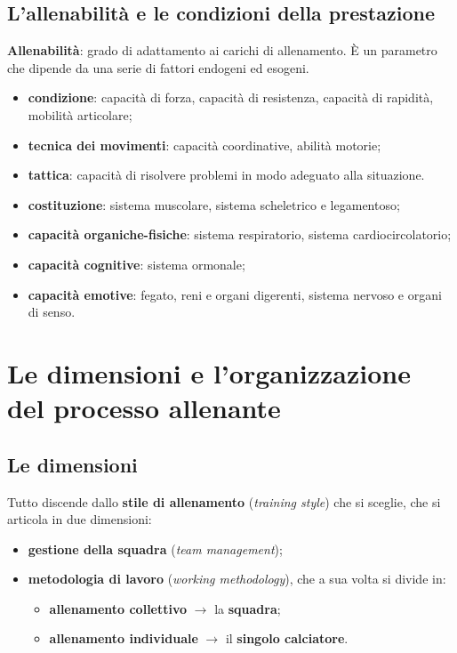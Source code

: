 \subsection{L'allenabilità e le condizioni della prestazione}

\textbf{Allenabilità}: grado di adattamento ai carichi di allenamento. È un parametro che dipende da
una serie di fattori endogeni ed esogeni.

\begin{itemize}
  \item \textbf{condizione}: capacità di forza, capacità di resistenza, capacità di rapidità,
    mobilità articolare;
  \item \textbf{tecnica dei movimenti}: capacità coordinative, abilità motorie;
  \item \textbf{tattica}: capacità di risolvere problemi in modo adeguato alla situazione.
\end{itemize}

\begin{itemize}
  \item \textbf{costituzione}: sistema muscolare, sistema scheletrico e legamentoso;
  \item \textbf{capacità organiche-fisiche}: sistema respiratorio, sistema cardiocircolatorio;
  \item \textbf{capacità cognitive}: sistema ormonale;
  \item \textbf{capacità emotive}: fegato, reni e organi digerenti, sistema nervoso e organi di
    senso.
\end{itemize}

\section{Le dimensioni e l'organizzazione del processo allenante}

\subsection{Le dimensioni}

Tutto discende dallo \textbf{stile di allenamento} (\textit{training style}) che si sceglie, che si
articola in due dimensioni:

\begin{itemize}
  \item \textbf{gestione della squadra} (\textit{team management});
  \item \textbf{metodologia di lavoro} (\textit{working methodology}), che a sua volta si divide in:
    \begin{itemize}
      \item \textbf{allenamento collettivo} $\rightarrow$ la \textbf{squadra};
      \item \textbf{allenamento individuale} $\rightarrow$ il \textbf{singolo calciatore}.
    \end{itemize}
\end{itemize}

